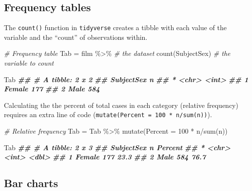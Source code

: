 \documentclass[
  12pt,
]{krantz}
\newenvironment{Shaded}{\begin{snugshade}}{\end{snugshade}}
\newcommand{\AttributeTok}[1]{\textcolor[rgb]{0.77,0.63,0.00}{#1}}
\newcommand{\CommentTok}[1]{\textcolor[rgb]{0.56,0.35,0.01}{\textit{#1}}}
\newcommand{\DecValTok}[1]{\textcolor[rgb]{0.00,0.00,0.81}{#1}}
\newcommand{\DocumentationTok}[1]{\textcolor[rgb]{0.56,0.35,0.01}{\textbf{\textit{#1}}}}
\newcommand{\FunctionTok}[1]{\textcolor[rgb]{0.00,0.00,0.00}{#1}}
\newcommand{\NormalTok}[1]{#1}
\newcommand{\OtherTok}[1]{\textcolor[rgb]{0.56,0.35,0.01}{#1}}
\newcommand{\SpecialCharTok}[1]{\textcolor[rgb]{0.00,0.00,0.00}{#1}}
\begin{document}
\hypertarget{frequency-tables}{%
\subsection{Frequency tables}\label{frequency-tables}}

The \texttt{count()} function in \texttt{tidyverse} creates a tibble with each value of the variable and the ``count'' of observations within.

\begin{Shaded}
\begin{Highlighting}[]
\CommentTok{\# Frequency table}
\NormalTok{  Tab }\OtherTok{=}
\NormalTok{    film }\SpecialCharTok{\%\textgreater{}\%}   \CommentTok{\# the dataset}
    \FunctionTok{count}\NormalTok{(SubjectSex) }\CommentTok{\# the variable to count}
  
\NormalTok{  Tab}
\DocumentationTok{\#\# \# A tibble: 2 x 2}
\DocumentationTok{\#\#   SubjectSex     n}
\DocumentationTok{\#\# * \textless{}chr\textgreater{}      \textless{}int\textgreater{}}
\DocumentationTok{\#\# 1 Female       177}
\DocumentationTok{\#\# 2 Male         584}
\end{Highlighting}
\end{Shaded}

Calculating the the percent of total cases in each category (relative frequency) requires an extra line of code (\texttt{mutate(Percent\ =\ 100\ *\ n/sum(n))}).

\begin{Shaded}
\begin{Highlighting}[]
\CommentTok{\# Relative frequency}
\NormalTok{  Tab }\OtherTok{=} 
\NormalTok{    Tab }\SpecialCharTok{\%\textgreater{}\%}
    \FunctionTok{mutate}\NormalTok{(}\AttributeTok{Percent =} \DecValTok{100} \SpecialCharTok{*}\NormalTok{ n}\SpecialCharTok{/}\FunctionTok{sum}\NormalTok{(n))}
  
\NormalTok{  Tab}
\DocumentationTok{\#\# \# A tibble: 2 x 3}
\DocumentationTok{\#\#   SubjectSex     n Percent}
\DocumentationTok{\#\# * \textless{}chr\textgreater{}      \textless{}int\textgreater{}   \textless{}dbl\textgreater{}}
\DocumentationTok{\#\# 1 Female       177    23.3}
\DocumentationTok{\#\# 2 Male         584    76.7}
\end{Highlighting}
\end{Shaded}

\hypertarget{bar-charts}{%
\subsection{Bar charts}\label{bar-charts}}
\end{document}
